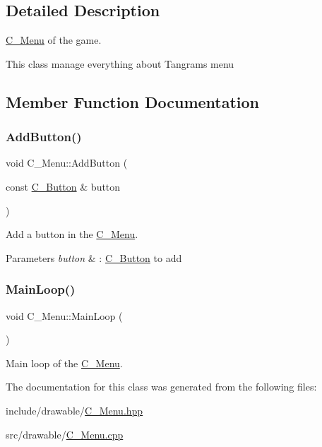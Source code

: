 \subsection{Detailed Description}
\hyperlink{classC__Menu}{C\+\_\+\+Menu} of the game. 

This class manage everything about Tangram\textquotesingle{}s menu 

\subsection{Member Function Documentation}
\mbox{\label{classC__Menu_a9a4f7a0022f39f35b7af9c5d2b6f31ec}} 
\subsubsection{\texorpdfstring{Add\+Button()}{AddButton()}}
{\footnotesize\ttfamily void C\+\_\+\+Menu\+::\+Add\+Button (\begin{DoxyParamCaption}\item[{const \hyperlink{classC__Button}{C\+\_\+\+Button} \&}]{button }\end{DoxyParamCaption})}



Add a button in the \hyperlink{classC__Menu}{C\+\_\+\+Menu}. 


\begin{DoxyParams}{Parameters}
{\em button} & \+: \hyperlink{classC__Button}{C\+\_\+\+Button} to add \\
\hline
\end{DoxyParams}
\mbox{\label{classC__Menu_a9529be708fad2c6deca21034bc37f59d}} 
\subsubsection{\texorpdfstring{Main\+Loop()}{MainLoop()}}
{\footnotesize\ttfamily void C\+\_\+\+Menu\+::\+Main\+Loop (\begin{DoxyParamCaption}{ }\end{DoxyParamCaption})}



Main loop of the \hyperlink{classC__Menu}{C\+\_\+\+Menu}. 



The documentation for this class was generated from the following files\+:\begin{DoxyCompactItemize}
\item 
include/drawable/\hyperlink{C__Menu_8hpp}{C\+\_\+\+Menu.\+hpp}\item 
src/drawable/\hyperlink{C__Menu_8cpp}{C\+\_\+\+Menu.\+cpp}\end{DoxyCompactItemize}
